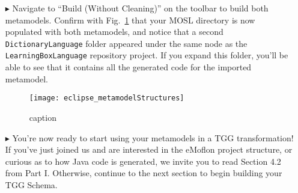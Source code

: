 \begin{itemize}
\item[$\blacktriangleright$] Navigate to ``Build (Without Cleaning)'' on the toolbar to build both metamodels. Confirm with
Fig.~\ref{fig:bothmetamodelstructures} that your MOSL directory is now populated with both metamodels, and notice that a second \texttt{Dictionary\-Language}
folder appeared under the same node as the \texttt{LearningBoxLanguage} repository project. If you expand this folder, you'll be able to see that it contains
all the generated code for the imported metamodel.

\begin{figure}[htbp]
\begin{center}
  \texttt{[image: eclipse\_metamodelStructures]}
  \caption{caption}
  \label{fig:bothmetamodelstructures}
\end{center}
\end{figure}

\item[$\blacktriangleright$] You're now ready to start using your metamodels in a TGG transformation! If you've just joined us and are interested in the eMoflon
project structure, or curious as to how Java code is generated, we invite you to read Section 4.2 from Part I. Otherwise, continue to the next section to begin
building your TGG Schema.

\end{itemize}

